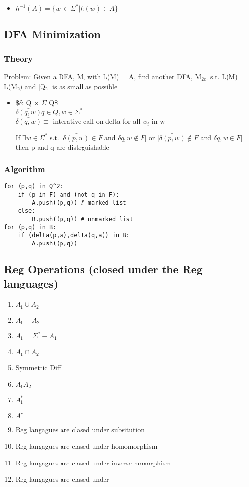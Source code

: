 \documentclass[11pt]{article}
\begin{document}
\begin{itemize}
\item $h^{-1}(A) = \{w\ \in \Sigma^* | h(w) \in A\}$
\end{itemize}
\subsection{DFA Minimization}
\label{sec-2.7}

\subsubsection{Theory}
\label{sec-2.7.1}

   Problem: Given a DFA, M, with L(M) = A, find another DFA, M$_{\mathrm{2c}}$,
   s.t. L(M) = L(M$_2$) and |Q$_2$| is as small as possible\\
\begin{itemize}
\item \$$\delta$: Q $\times$ $\Sigma$ \rightarrow Q\$\\
     $\bar{\delta(q,w)} q\in Q, w\in \Sigma^*$ \\
     $\bar{\delta(q,w)} \equiv$ interative call on delta for all $w_i$
     in w

     If $\exists w \in \Sigma^*$ s.t. $[\bar{\delta(p,w)} \in F$ and
     $\delta{q,w} \notin F]$ or $[\bar{\delta(p,w)} \notin F$ and
     $\delta{q,w} \in F]$ then p and q are distrguishable
\end{itemize}
\subsubsection{Algorithm}
\label{sec-2.7.2}


\begin{verbatim}
for (p,q) in Q^2:
    if (p in F) and (not q in F):
        A.push((p,q)) # marked list
    else:
        B.push((p,q)) # unmarked list
for (p,q) in B:
    if (delta(p,a),delta(q,a)) in B:
        A.push((p,q))
\end{verbatim}


\subsection{Reg Operations (closed under the Reg languages)}
\label{sec-2.8}

\begin{enumerate}
\item $A_1 \cup A_2$
\item $A_1 - A_2$
\item $\bar{A_1} = \Sigma^* - A_1$
\item $A_1 \cap A_2$
\item Symmetric Diff
\item $A_1 A_2$
\item $A_1^*$
\item $A^r$
\item Reg langagues are clased under subsitution
\item Reg langagues are clased under homomorphism
\item Reg langagues are clased under inverse homorphism
\item Reg langagues are clased under
\end{enumerate}
\end{document}

